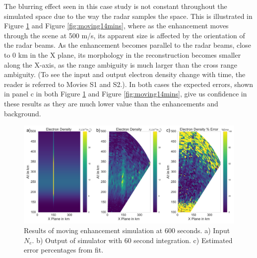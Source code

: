 \documentclass[draft,ras]{agutex}
\begin{document}
\begin{article}
The blurring effect seen in this case study is not constant throughout the simulated space due to the way the radar samples the space. This is illustrated in Figure \ref{fig:moving10mins} and Figure \ref{fig:moving14mins}, where as the enhancement moves through the scene at 500 m/s, its apparent size is affected by the orientation of the radar beams. 
As the enhancement becomes parallel to the radar beams, close to 0 km in the X plane,
its morphology in the reconstruction becomes smaller along the X-axis, as the range ambiguity is much larger than the cross range ambiguity. (To see the input and output electron density change with time, the reader is referred to Movies S1 and S2.). In both cases the expected errors, shown in panel c in both Figure \ref{fig:moving10mins} and Figure \ref{fig:moving14mins}, give us confidence in these results as they are much lower value than the enhancements and background.
\begin{figure}[!t]
\centering
\includegraphics[width=6in]{moving6mins}
\caption{Results of moving enhancement simulation at 600 seconds. a) Input $N_e$. b) Output of simulator with 60 second integration. c) Estimated error percentages from fit.}
\label{fig:moving10mins}
\end{figure}



\end{article}
\end{document}
